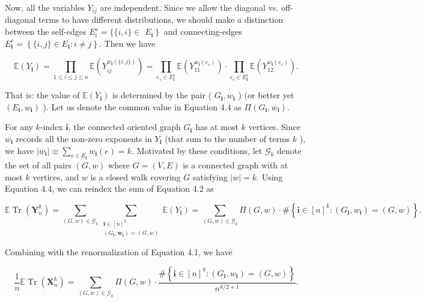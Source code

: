 \documentclass[10pt]{article}
\begin{document}
Now, all the variables $Y_{i j}$ are independent. Since we allow the diagonal vs. off-diagonal terms to have different distributions, we should make a distinction between the self-edges $E_{\mathrm{i}}^{s}=\{\{i, i\} \in$ $\left.E_{\mathbf{i}}\right\}$ and connecting-edges $E_{\mathbf{i}}^{c}=\left\{\{i, j\} \in E_{\mathbf{i}}: i \neq j\right\}$. Then we have


\begin{equation*}
\mathbb{E}\left(Y_{\mathbf{i}}\right)=\prod_{1 \leq i \leq j \leq n} \mathbb{E}\left(Y_{i j}^{w_{\mathbf{i}}(\{i, j\})}\right)=\prod_{e_{s} \in E_{\mathbf{i}}^{s}} \mathbb{E}\left(Y_{11}^{w_{\mathbf{i}}\left(e_{s}\right)}\right) \cdot \prod_{e_{c} \in E_{\mathbf{i}}^{c}} \mathbb{E}\left(Y_{12}^{w_{\mathbf{i}}\left(e_{c}\right)}\right) . \tag{4.4}
\end{equation*}


That is: the value of $\mathbb{E}\left(Y_{\mathbf{i}}\right)$ is determined by the pair ( $G_{\mathbf{i}}, w_{\mathbf{i}}$ ) (or better yet $\left(E_{\mathbf{i}}, w_{\mathbf{i}}\right)$ ). Let us denote the common value in Equation 4.4 as $\Pi\left(G_{\mathbf{i}}, w_{\mathbf{i}}\right)$.

For any $k$-index $\mathbf{i}$, the connected oriented graph $G_{\mathbf{i}}$ has at most $k$ vertices. Since $w_{\mathbf{i}}$ records all the non-zero exponents in $Y_{\mathbf{i}}$ (that sum to the number of terms $k$ ), we have $\left|w_{\mathbf{i}}\right| \equiv \sum_{e \in E_{\mathbf{i}}} w_{\mathbf{i}}(e)=k$. Motivated by these conditions, let $\mathcal{G}_{k}$ denote the set of all pairs $(G, w)$ where $G=(V, E)$ is a connected graph with at most $k$ vertices, and $w$ is a closed walk covering $G$ satisfying $|w|=k$. Using Equation 4.4, we can reindex the sum of Equation 4.2 as


\begin{equation*}
\mathbb{E} \operatorname{Tr}\left(\mathbf{Y}_{n}^{k}\right)=\sum_{(G, w) \in \mathcal{G}_{k}} \sum_{\substack{\mathbf{i} \in[n]^{k} \\\left(G_{\mathbf{i}}, \mathbf{w}_{\mathbf{i}}\right)=(G, w)}} \mathbb{E}\left(Y_{\mathbf{i}}\right)=\sum_{(G, w) \in \mathcal{G}_{k}} \Pi(G, w) \cdot \#\left\{\mathbf{i} \in[n]^{k}:\left(G_{\mathbf{i}}, w_{\mathbf{i}}\right)=(G, w)\right\} . \tag{4.5}
\end{equation*}


Combining with the renormalization of Equation 4.1, we have


\begin{equation*}
\frac{1}{n} \mathbb{E} \operatorname{Tr}\left(\mathbf{X}_{n}^{k}\right)=\sum_{(G, w) \in \mathcal{G}_{k}} \Pi(G, w) \cdot \frac{\#\left\{\mathbf{i} \in[n]^{k}:\left(G_{\mathbf{i}}, w_{\mathbf{i}}\right)=(G, w)\right\}}{n^{k / 2+1}} . \tag{4.6}
\end{equation*}
\end{document}
